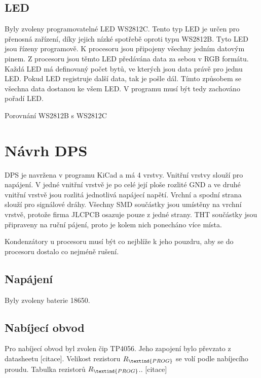 \section{LED}
Byly zvoleny programovatelné LED WS2812C. Tento typ LED je určen pro přenosná zařízení, díky jejich nízké spotřebě oproti typu WS2812B.
Tyto LED jsou řízeny programově. K procesoru jsou připojeny všechny jedním datovým pinem. Z procesoru jsou těmto LED předávána data za sebou v
RGB formátu. Každá LED má definovaný počet bytů, ve kterých jsou data právě pro jednu LED. Pokud LED registruje další data, tak je pošle dál.
Tímto způsobem se všechna data dostanou ke všem LED. V programu musí být tedy zachováno pořadí LED. 

Porovnání WS2812B s WS2812C

\chapter{Návrh DPS}
DPS je navržena v programu KiCad a má 4 vrstvy. Vnitřní vrstvy slouží pro napájení. V jedné vnitřní vrstvě je po celé její
ploše rozlité GND a ve druhé vnitřní vrstvě jsou rozlitá jednotlivá napájecí napětí. 
Vrchní a spodní strana slouží pro signálové dráhy. Všechny SMD součástky jsou umístěny na vrchní vrstvě, protože firma
JLCPCB osazuje pouze z jedné strany. THT součástky jsou připraveny na ruční pájení, proto je kolem nich ponecháno více místa.

Kondenzátory u procesoru musí být co nejblíže k jeho pouzdru, aby se do procesoru dostalo co nejméně rušení.


\section{Napájení}
Byly zvoleny baterie 18650.

\section{Nabíjecí obvod}
Pro nabíjecí obvod byl zvolen čip TP4056. Jeho zapojení bylo převzato z datasheetu [citace]. %
Velikost rezistoru $R_\textind{PROG}$ se volí podle nabíjecího proudu. 
Tabulka rezistorů $R_\textind{PROG}$.. [citace]

